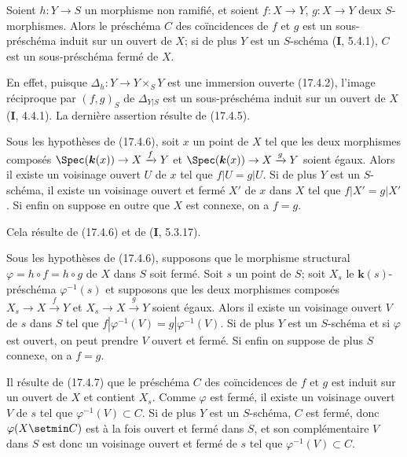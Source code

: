 \begin{proposition}[17.4.6]
\label{IV.17.4.6}
Soient $h:Y\to S$ un morphisme non ramifié, et soient $f:X\to Y$, $g:X\to Y$ deux $S$-morphismes. Alors le préschéma $C$ des coïncidences de $f$ et $g$ est un sous-préschéma induit sur un ouvert de $X$; si de plus $Y$ est un $S$-schéma \textup{(\textbf{I}, 5.4.1)}, $C$ est un sous-préschéma fermé de $X$.
\end{proposition}

En effet, puisque $\Delta_h:Y\to Y\times_S Y$ est une immersion ouverte (17.4.2), l'image réciproque par $(f,g)_S$ de $\Delta_{Y|S}$ est un sous-préschéma induit sur un ouvert de $X$ (\textbf{I}, 4.4.1). La dernière assertion résulte de (17.4.5).

\begin{corollary}[17.4.7]
\label{IV.17.4.7}
Sous les hypothèses de \textup{(17.4.6)}, soit $x$ un point de $X$ tel que les deux morphismes composés $\Spec(\boldsymbol{k}(x))\to X\xrightarrow{f}Y$ et $\Spec(\boldsymbol{k}(x))\to X\xrightarrow{g}Y$ soient égaux. Alors il existe un voisinage ouvert $U$ de $x$ tel que $f|U=g|U$. Si de plus $Y$ est un $S$-schéma, il existe un voisinage ouvert et fermé $X'$ de $x$ dans $X$ tel que $f|X'=g|X'$. Si enfin on suppose en outre que $X$ est connexe, on a $f=g$.
\end{corollary}

Cela résulte de (17.4.6) et de (\textbf{I}, 5.3.17).

\begin{corollary}[17.4.8]
\label{IV.17.4.8}
Sous les hypothèses de \textup{(17.4.6)}, supposons que le morphisme structural $\varphi=h\circ f=h\circ g$ de $X$ dans $S$ soit fermé. Soit $s$ un point de $S$; soit $X_s$ le $\boldsymbol{k}(s)$-préschéma $\varphi^{-1}(s)$ et supposons que les deux morphismes composés $X_s\to X\xrightarrow{f}Y$ et $X_s\to X\xrightarrow{g}Y$ soient égaux. Alors il existe un voisinage ouvert $V$ de $s$ dans $S$ tel que $f|\varphi^{-1}(V)=g|\varphi^{-1}(V)$. Si de plus $Y$ est un $S$-schéma et si $\varphi$ est ouvert, on peut prendre $V$ ouvert et fermé. Si enfin on suppose de plus $S$ connexe, on a $f=g$.
\end{corollary}

Il résulte de (17.4.7) que le préschéma $C$ des coïncidences de $f$ et $g$ est induit sur un ouvert de $X$ et contient $X_s$. Comme $\varphi$ est fermé, il existe un voisinage ouvert $V$ de $s$ tel que $\varphi^{-1}(V)\subset C$. Si de plus $Y$ est un $S$-schéma, $C$ est fermé, donc $\varphi(X\setmin C)$ est à la
fois ouvert et fermé dans $S$, et son complémentaire $V$ dans $S$ est donc un voisinage ouvert et fermé de $s$ tel que $\varphi^{-1}(V)\subset C$.

